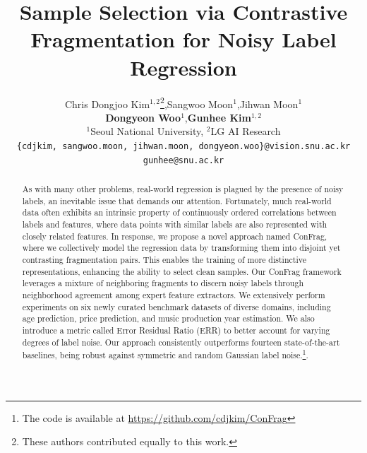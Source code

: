 \documentclass{article}
\title{Sample Selection via Contrastive Fragmentation for Noisy Label Regression}
\author{%
  Chris Dongjoo Kim$^{1,2}$\thanks{These authors contributed equally to this work.},\quad Sangwoo Moon$^{1}$\footnotemark[1],\quad Jihwan Moon$^{1}$ \\
  \textbf{Dongyeon Woo}$^{1}$,\quad \textbf{Gunhee Kim}$^{1,2}$ \\
  $^{1}$Seoul National University, $^{2}$LG AI Research \\
  \texttt{\{cdjkim, sangwoo.moon, jihwan.moon, dongyeon.woo\}@vision.snu.ac.kr}\\ 
  \texttt{gunhee@snu.ac.kr} \\
}
\theoremstyle{plain}
\theoremstyle{definition}
\theoremstyle{remark}
\begin{document}
\maketitle


\begin{abstract}
As with many other problems, real-world regression is plagued by the presence of noisy labels, an inevitable issue that demands our attention. 
Fortunately, much real-world data often exhibits an intrinsic property of continuously ordered correlations between labels and features, where data points with similar labels are also represented with closely related features.
In response, we propose a novel approach named ConFrag, where we collectively model the regression data by transforming them into disjoint yet contrasting fragmentation pairs. 
This enables the training of more distinctive representations, enhancing the ability to select clean samples.
Our ConFrag framework leverages a mixture of neighboring fragments to discern noisy labels through neighborhood agreement among expert feature extractors.
We extensively perform experiments on six newly curated benchmark datasets of diverse domains, including age prediction, price prediction, and music production year estimation.
We also introduce a metric called Error Residual Ratio (ERR) to better account for varying degrees of label noise.
Our approach consistently outperforms fourteen state-of-the-art baselines, being robust against symmetric and random Gaussian label noise.\footnote{The code is available at \url{https://github.com/cdjkim/ConFrag}}.

\end{abstract}
\end{document}
